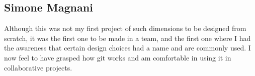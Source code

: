 \subsection{Simone Magnani}

Although this was not my first project of such dimensions to be designed from
scratch, it was the first one to be made in a team, and the first one where I
had the awareness that certain design choices had a name and are commonly used.
I now feel to have grasped how git works and am comfortable in using it in collaborative projects.
